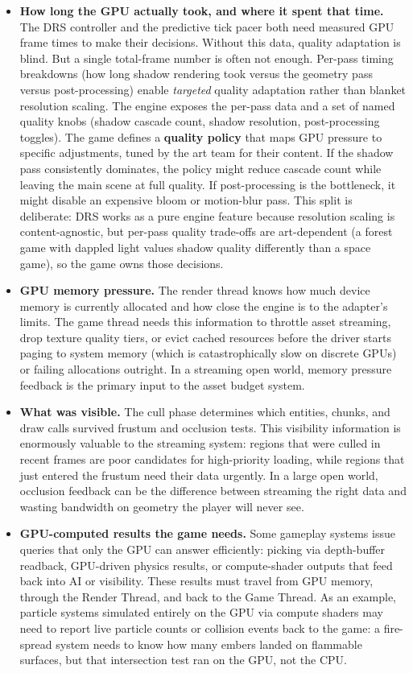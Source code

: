 \documentclass[
  11pt,
  letterpaper,
  DIV=11,
  numbers=noendperiod,
  twoside,
  open=right]{scrreprt}
\providecommand{\tightlist}{%
  \setlength{\itemsep}{0pt}\setlength{\parskip}{0pt}}
\begin{document}
\begin{itemize}
\tightlist
\item
  \textbf{How long the GPU actually took, and where it spent that time.}
  The DRS controller and the predictive tick pacer both need measured
  GPU frame times to make their decisions. Without this data, quality
  adaptation is blind. But a single total-frame number is often not
  enough. Per-pass timing breakdowns (how long shadow rendering took
  versus the geometry pass versus post-processing) enable
  \emph{targeted} quality adaptation rather than blanket resolution
  scaling. The engine exposes the per-pass data and a set of named
  quality knobs (shadow cascade count, shadow resolution,
  post-processing toggles). The game defines a \textbf{quality policy}
  that maps GPU pressure to specific adjustments, tuned by the art team
  for their content. If the shadow pass consistently dominates, the
  policy might reduce cascade count while leaving the main scene at full
  quality. If post-processing is the bottleneck, it might disable an
  expensive bloom or motion-blur pass. This split is deliberate: DRS
  works as a pure engine feature because resolution scaling is
  content-agnostic, but per-pass quality trade-offs are art-dependent (a
  forest game with dappled light values shadow quality differently than
  a space game), so the game owns those decisions.
\item
  \textbf{GPU memory pressure.} The render thread knows how much device
  memory is currently allocated and how close the engine is to the
  adapter's limits. The game thread needs this information to throttle
  asset streaming, drop texture quality tiers, or evict cached resources
  before the driver starts paging to system memory (which is
  catastrophically slow on discrete GPUs) or failing allocations
  outright. In a streaming open world, memory pressure feedback is the
  primary input to the asset budget system.
\item
  \textbf{What was visible.} The cull phase determines which entities,
  chunks, and draw calls survived frustum and occlusion tests. This
  visibility information is enormously valuable to the streaming system:
  regions that were culled in recent frames are poor candidates for
  high-priority loading, while regions that just entered the frustum
  need their data urgently. In a large open world, occlusion feedback
  can be the difference between streaming the right data and wasting
  bandwidth on geometry the player will never see.
\item
  \textbf{GPU-computed results the game needs.} Some gameplay systems
  issue queries that only the GPU can answer efficiently: picking via
  depth-buffer readback, GPU-driven physics results, or compute-shader
  outputs that feed back into AI or visibility. These results must
  travel from GPU memory, through the Render Thread, and back to the
  Game Thread. As an example, particle systems simulated entirely on the
  GPU via compute shaders may need to report live particle counts or
  collision events back to the game: a fire-spread system needs to know
  how many embers landed on flammable surfaces, but that intersection
  test ran on the GPU, not the CPU.
\end{itemize}
\end{document}
